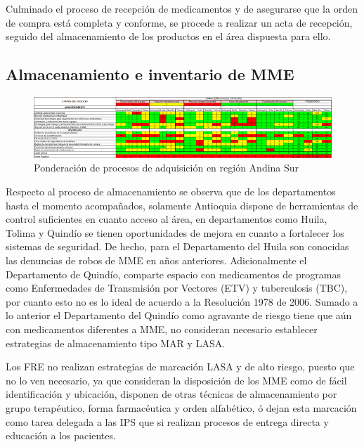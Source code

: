 \documentclass[
]{book}
\begin{document}
Culminado el proceso de recepción de medicamentos y de asegurarse que la orden de compra está completa y conforme, se procede a realizar un acta de recepción, seguido del almacenamiento de los productos en el área dispuesta para ello.

\hypertarget{almacenamiento-e-inventario-de-mme-1}{%
\subsection{Almacenamiento e inventario de MME}\label{almacenamiento-e-inventario-de-mme-1}}

\begin{figure}

{\centering \includegraphics[width=1\linewidth]{figures/Imagen23} 

}

\caption{Ponderación de procesos de adquisición en región Andina Sur}\label{fig:EtapasProcesoRegionAndinaSur}
\end{figure}

Respecto al proceso de almacenamiento se observa que de los departamentos hasta el momento acompañados, solamente Antioquia dispone de herramientas de control suficientes en cuanto acceso al área, en departamentos como Huila, Tolima y Quindío se tienen oportunidades de mejora en cuanto a fortalecer los sistemas de seguridad. De hecho, para el Departamento del Huila son conocidas las denuncias de robos de MME en años anteriores. Adicionalmente el Departamento de Quindío, comparte espacio con medicamentos de programas como Enfermedades de Transmisión por Vectores (ETV) y tuberculosis (TBC), por cuanto esto no es lo ideal de acuerdo a la Resolución 1978 de 2006. Sumado a lo anterior el Departamento del Quindío como agravante de riesgo tiene que aún con medicamentos diferentes a MME, no consideran necesario establecer estrategias de almacenamiento tipo MAR y LASA.

Los FRE no realizan estrategias de marcación LASA y de alto riesgo, puesto que no lo ven necesario, ya que consideran la disposición de los MME como de fácil identificación y ubicación, disponen de otras técnicas de almacenamiento por grupo terapéutico, forma farmacéutica y orden alfabético, ó dejan esta marcación como tarea delegada a las IPS que si realizan procesos de entrega directa y educación a los pacientes.
\end{document}
